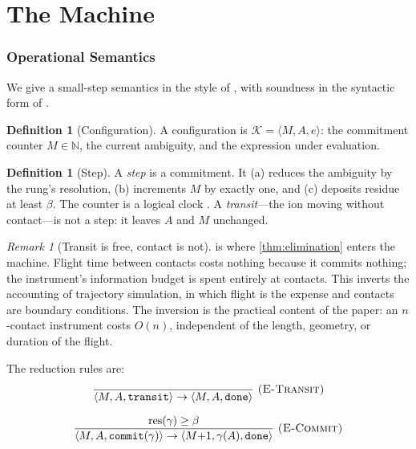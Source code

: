 \documentclass[11pt,a4paper]{article}
\theoremstyle{plain}
\theoremstyle{definition}
\newtheorem{definition}[theorem]{Definition}
\theoremstyle{remark}
\newtheorem{remark}[theorem]{Remark}
\newcommand{\N}{\mathbb{N}}
\newcommand{\res}{\operatorname{res}}
\newcommand{\flo}{\beta}
\newcommand{\Rung}{\gamma}
\newcommand{\Conf}{\mathcal{K}}
\newcommand{\Amb}{A}
\begin{document}
\part{The Machine}
\label{part:machine}

\section{Operational Semantics}
\label{sec:semantics}

We give a small-step semantics in the style of \citet{plotkin1981}, with
soundness in the syntactic form of \citet{wright1994}.

\begin{definition}[Configuration]
\label{def:config}
A configuration is $\Conf = \langle M, \Amb, e \rangle$: the commitment counter
$M \in \N$, the current ambiguity, and the expression under evaluation.
\end{definition}

\begin{definition}[Step]
\label{def:step}
A \emph{step} is a commitment. It (a) reduces the ambiguity by the rung's
resolution, (b) increments $M$ by exactly one, and (c) deposits residue at least
$\flo$. The counter is a logical clock \citep{lamport1978}. A \emph{transit}---the
ion moving without contact---is not a step: it leaves $\Amb$ and $M$ unchanged.
\end{definition}

\begin{remark}[Transit is free, contact is not]
\label{rem:transitfree}
 is where \cref{thm:elimination} enters the machine. Flight time
between contacts costs nothing because it commits nothing; the instrument's
information budget is spent entirely at contacts. This inverts the accounting of
trajectory simulation, in which flight is the expense and contacts are boundary
conditions. The inversion is the practical content of the paper: an
$n$-contact instrument costs $O(n)$, independent of the length, geometry, or
duration of the flight.
\end{remark}

The reduction rules are:
\[
\frac{}{\langle M, \Amb, \texttt{transit}\rangle \to
        \langle M, \Amb, \texttt{done}\rangle}
\ \textsc{(E-Transit)}
\]

\[
\frac{\res(\Rung) \geq \flo}
     {\langle M, \Amb, \texttt{commit}(\Rung)\rangle \to
      \langle M{+}1, \Rung(\Amb), \texttt{done}\rangle}
\ \textsc{(E-Commit)}
\]
\end{document}
